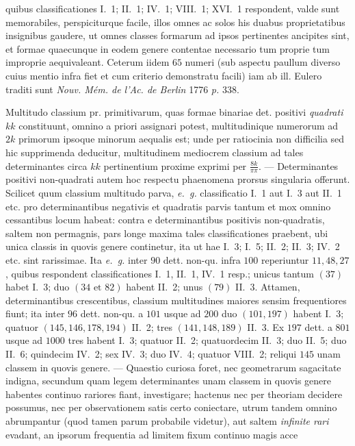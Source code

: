quibus classificationes I.~1; II.~1; IV.~1; VIII.~1; XVI.~1 respondent, valde sunt memorabiles, perspiciturque facile, illos omnes ac solos his duabus proprietatibus insignibus gaudere, ut omnes classes formarum ad ipsos pertinentes ancipites sint, et formae quaecunque in eodem genere contentae necessario tum proprie tum improprie aequivaleant. Ceterum iidem \(65\) numeri (sub aspectu paullum diverso cuius mentio infra fiet et cum criterio demonstratu facili) iam ab ill. Eulero traditi sunt \textit{Nouv. Mém. de l’Ac. de Berlin} 1776 \textit{p.} 338.

Multitudo classium pr. primitivarum, quas formae binariae det. positivi \textit{quadrati} \(kk\) constituunt, omnino a priori assignari potest, multitudinique numerorum ad \(2k\) primorum ipsoque minorum aequalis est; unde per ratiocinia non difficilia sed hic supprimenda deducitur, multitudinem mediocrem classium ad tales determinantes circa \(kk\) pertinentium proxime exprimi per \(\frac{8k}{\pi\pi}\). — Determinantes positivi non-quadrati autem hoc respectu phaenomena prorsus singularia offerunt. Scilicet quum classium multitudo parva, \textit{e.~g.} classificatio I.~1 aut I.~3 aut II.~1 etc. pro determinantibus negativis et quadratis parvis tantum et mox omnino cessantibus locum habeat: contra e determinantibus positivis non-quadratis, saltem non permagnis, pars longe maxima tales classificationes praebent, ubi unica classis in quovis genere continetur, ita ut hae I.~3; I.~5; II.~2; II.~3; IV.~2 etc. sint rarissimae. Ita \textit{e.~g.} inter \(90\) dett. non-qu. infra \(100\) reperiuntur \(11,48,27\), quibus respondent classificationes I.~1, II.~1, IV.~1 resp.; unicus tantum \((37)\) habet I.~3; duo \((34\text{ et }82)\) habent II.~2; unus \((79)\) II.~3. Attamen, determinantibus crescentibus, classium multitudines maiores sensim frequentiores fiunt; ita inter \(96\) dett. non-qu. a \(101\) usque ad \(200\) duo \((101,197)\) habent I.~3; quatuor \((145,146,178,194)\) II.~2; tres \((141,148,189)\) II.~3. Ex \(197\) dett. a \(801\) usque ad \(1000\) tres habent I.~3; quatuor II.~2; quatuordecim II.~3; duo II.~5; duo II.~6; quindecim IV.~2; sex IV.~3; duo IV.~4; quatuor VIII.~2; reliqui \(145\) unam classem in quovis genere. — Quaestio curiosa foret, nec geometrarum sagacitate indigna, secundum quam legem determinantes unam classem in quovis genere habentes continuo rariores fiant, investigare; hactenus nec per theoriam decidere possumus, nec per observationem satis certo coniectare, utrum tandem omnino abrumpantur (quod tamen parum probabile videtur), aut saltem \textit{infinite rari} evadant, an ipsorum frequentia ad limitem fixum continuo magis acce%
